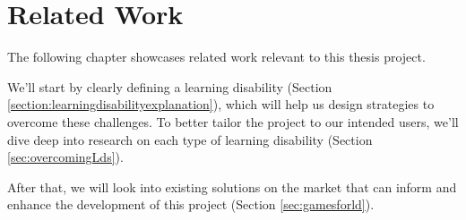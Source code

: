 % 
%  
%
\chapter{Related Work}
\label{cha:related_work}

The following chapter showcases related work relevant to this thesis project.

We’ll start by clearly defining a learning disability (Section \ref{section:learningdisabilityexplanation}), which will help us design strategies to overcome these challenges. To better tailor the project to our intended users, we’ll dive deep into research on each type of learning disability (Section \ref{sec:overcomingLds}).

After that, we will look into existing solutions on the market that can inform and enhance the development of this project (Section \ref{sec:gamesforld}).



\newpage
















